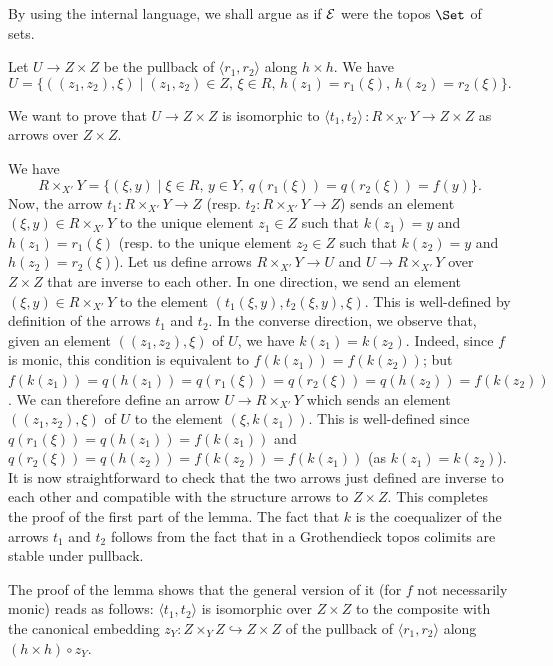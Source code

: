 \documentclass[a4paper,12pt]{article}
\begin{document}
\begin{proofs}
	By using the internal language, we shall argue as if $\cal E$ were the topos $\Set$ of sets.
	
	Let $U\to Z\times Z$ be the pullback of $\langle r_{1}, r_{2} \rangle  $ along $h\times h$. We have 
	\[
	U=\{ ((z_{1}, z_{2}), \xi) \mid  (z_{1}, z_{2})\in Z, \, \xi\in R, \, h(z_{1})=r_{1}(\xi), \, h(z_{2})=r_{2}(\xi) \}.
	\]
	
	We want to prove that $U\to Z\times Z$ is isomorphic to  $\langle t_{1}, t_{2}\rangle\,:R\times_{X'} Y \to Z\times Z$ as arrows over $Z\times Z$. 
	
	We have $$R\times_{X'} Y=\{(\xi, y) \mid \xi \in R, \, y\in Y, \, q(r_{1}(\xi))=q(r_{2}(\xi))=f(y) \}.$$
	Now, the arrow $t_{1}:R\times_{X'} Y \to Z$ (resp. $t_{2}:R\times_{X'} Y \to Z$) sends an element $(\xi, y)\in R\times_{X'} Y$ to the unique element $z_{1}\in Z$ such that $k(z_{1})=y$ and $h(z_{1})=r_{1}(\xi)$ (resp. to the unique element $z_{2}\in Z$ such that $k(z_{2})=y$ and $h(z_{2})=r_{2}(\xi)$). Let us define arrows $R\times_{X'} Y \to U$ and $U \to R\times_{X'} Y$ over $Z\times Z$ that are inverse to each other. In one direction, we send an element $(\xi, y)\in R\times_{X'} Y$ to the element $(t_{1}(\xi, y), t_{2}(\xi, y), \xi)$. This is well-defined by definition of the arrows $t_{1}$ and $t_{2}$. In the converse direction, we observe that, given an element $((z_{1}, z_{2}), \xi) $ of $U$, we have $k(z_{1})=k(z_{2})$. Indeed, since $f$ is monic, this condition is equivalent to $f(k(z_{1}))=f(k(z_{2}))$; but $f(k(z_{1}))=q(h(z_{1}))=q(r_{1}(\xi))=q(r_{2}(\xi))=q(h(z_{2}))=f(k(z_{2}))$. We can therefore define an arrow $U\to R\times_{X'} Y$ which sends an element $((z_{1}, z_{2}), \xi) $ of $U$ to the element $(\xi, k(z_{1}))$. This is well-defined since $q(r_{1}(\xi))=q(h(z_{1}))=f(k(z_{1}))$ and $q(r_{2}(\xi))=q(h(z_{2}))=f(k(z_{2}))=f(k(z_{1}))$ (as $k(z_{1})=k(z_{2})$). It is now straightforward to check that the two arrows just defined are inverse to each other and compatible with the structure arrows to $Z\times Z$. This completes the proof of the first part of the lemma. The fact that $k$ is the coequalizer of the arrows $t_{1}$ and $t_{2}$ follows from the fact that in a Grothendieck topos colimits are stable under pullback.
\end{proofs}

\begin{remark}
	The proof of the lemma shows that the general version of it (for $f$ not necessarily monic) reads as follows: $\langle t_{1}, t_{2}\rangle$ is isomorphic over $Z\times Z$ to the composite with the canonical embedding $z_{Y}:Z\times_{Y} Z \hookrightarrow Z\times Z$ of the pullback of $\langle r_{1}, r_{2} \rangle  $ along $(h\times h)\circ z_{Y}$. 
\end{remark}
\end{document}
